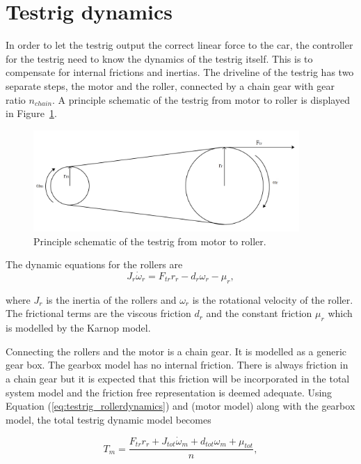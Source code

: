 \section{Testrig dynamics}\label{sec:rigdynamics}
In order to let the testrig output the correct linear force to the car, the
controller for the testrig need to know the dynamics of the testrig itself. This
is to compensate for internal frictions and inertias. The driveline of the
testrig has two separate steps, the motor and the roller, connected by a chain
gear with gear ratio $n_{chain}$. A principle schematic of the testrig from
motor to roller is displayed in Figure~\ref{fig:testrig_testrigdynamics}.
\begin{figure}[H]
    \centering
    \includegraphics[width=0.9\textwidth]{./img/testrig_rollerschematic.png}
    \caption{Principle schematic of the testrig from motor to roller.}\label{fig:testrig_testrigdynamics}
\end{figure}
The dynamic equations for the rollers are
\begin{equation} \label{eq:testrig_rollerdynamics}
    J_r \dot{\omega}_r = F_{tr}r_r - d_r \omega_r - \mu_r,
\end{equation}

where $J_r$ is the inertia of the rollers and $\omega_r$ is the rotational velocity
of the roller. The frictional terms are the viscous friction $d_r$ and the
constant friction $\mu_r$ which is modelled by the Karnop model.

Connecting the rollers and the motor is a chain gear. It is modelled as a
generic gear box. The gearbox model has no internal friction. There is always friction in a
chain gear but it is expected that this friction will be incorporated in the
total system model and the friction free representation is deemed adequate.
Using Equation (\ref{eq:testrig_rollerdynamics}) and (motor model) along with
the gearbox model, the total testrig dynamic model becomes

\begin{equation} \label{eq:testrig_totaldynamics} 
    T_m = \frac{F_{tr} r_r + J_{tot} \dot{\omega}_m + d_{tot} \omega_m + \mu_{tot}}{n},
\end{equation}

